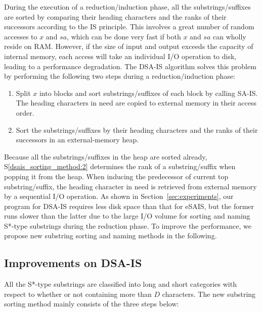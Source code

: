 \documentclass[10pt,journal,compsoc]{IEEEtran}
\begin{document}
During the execution of a reduction/induction phase, all the substrings/suffixes are sorted by comparing their heading characters and the ranks of their successors according to the IS principle. This involves a great number of random accesses to $x$ and $sa$, which can be done very fast if both $x$ and $sa$ can wholly reside on RAM. However, if the size of input and output exceeds the capacity of internal memory, each access will take an individual I/O operation to disk, leading to a performance degradation. The DSA-IS algorithm solves this problem by performing the following two steps during a reduction/induction phase:

\begin{enumerate}[S1]
	
	\item Split $x$ into blocks and sort substrings/suffixes of each block by calling SA-IS. The heading characters in need are copied to external memory in their access order. \label{dsais_sorting_method:1}
	
	\item Sort the substrings/suffixes by their heading characters and the ranks of their successors in an external-memory heap. \label{dsais_sorting_method:2}
\end{enumerate}

Because all the substrings/suffixes in the heap are sorted already, S\ref{dsais_sorting_method:2} determines the rank of a substring/suffix when popping it from the heap. When inducing the predecessor of current top substring/suffix, the heading character in need is retrieved from external memory by a sequential I/O operation. As shown in Section~\ref{sec:experiments}, our program for DSA-IS requires less disk space than that for eSAIS, but the former runs slower than the latter due to the large I/O volume for sorting and naming S*-type substrings during the reduction phase. To improve the performance, we propose new substring sorting and naming methods in the following.

\subsection{Improvements on DSA-IS}

All the S*-type substrings are classified into long and short categories with respect to whether or not containing more than $D$ characters. The new substring sorting method mainly consists of the three steps below:
\end{document}
